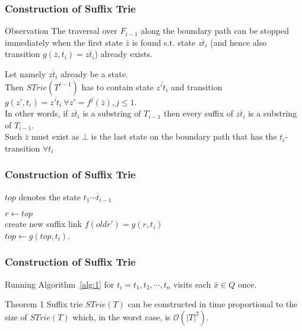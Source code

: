 \documentclass[compress,usenames,dvipsnames]{beamer}
\newenvironment{theoremblock}[1]{
    \setbeamercolor{block title}{bg=Emerald}
    \begin{block}{#1}}{\end{block}
}
\begin{document}
        \begin{frame} \frametitle{Construction of Suffix Trie}
            \begin{block}{Observation}
                The traversal over $F_{i-1}$ along the boundary path can be stopped immediately when the first state $\bar{z}$ is found s.t. state $\overline{zt_i}$ (and hence also transition $g(\bar{z}, t_i) = \overline{zt_i}$) already exists.
            \end{block}
            Let namely $\overline{zt_i}$ already be a state. \\
            \hfill \break
            Then $STrie(T^{i-1})$ has to contain state $\overline{z't_i}$ and transition $g(z', t_i) = \overline{z't_i} \ \forall z' = f^j(\bar{z}), j \leq 1$. \\
            In other words, if $\overline{zt_i}$ is a substring of $T_{i-1}$ then every suffix of $\overline{zt_i}$ is a substring of $T_{i-1}$.\\
            \hfill \break
            Such $\bar{z}$ must exist as $\bot$ is the last state on the boundary path that has the $t_i$-transition $\forall t_i$
        \end{frame}

        \begin{frame}\frametitle{Construction of Suffix Trie}
            $top$ denotes the state $\overline{t_1\cdots t_{i-1}}$
            \LinesNumbered
            \begin{algorithm}[H]
                \SetAlgoNoEnd
                $r \leftarrow top$ \\
                create new suffix link $f(oldr') = g(r, t_i)$ \\
                $top \leftarrow g(top, t_i)$.
                \caption{}
                \label{alg:1}
            \end{algorithm}
        \end{frame}

        \begin{frame}\frametitle{Construction of Suffix Trie}
            Running Algorithm~\ref{alg:1} for $t_i = t_1, t_2,\cdots, t_n$ visits each $\bar{x} \in Q$ once.
            \begin{theoremblock}{Theorem 1}
                Suffix trie $STrie(T)$ can be constructed in time proportional to
                the size of $STrie(T)$ which, in the worst case, is $\mathcal{O}(|T|^2)$.
            \end{theoremblock}
        \end{frame}
\end{document}
